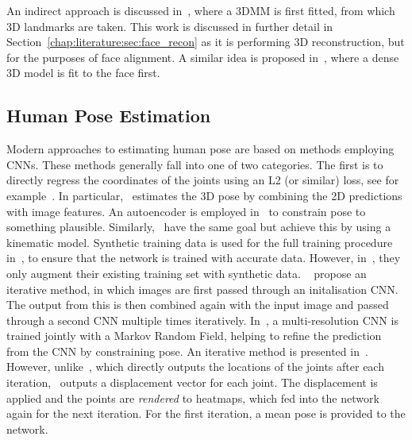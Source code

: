 An indirect approach is discussed in~\cite{zhu2016face}, where a 3DMM
is first fitted, from which 3D landmarks are taken. This work is
discussed in further detail in
Section~\ref{chap:literature:sec:face_recon} as it is performing 3D
reconstruction, but for the purposes of face alignment. A similar idea
is proposed in~\cite{jourabloo2016large}, where a dense 3D model is
fit to the face first.

\subsection{Human Pose Estimation}


Modern approaches to estimating human pose are based on methods
employing CNNs. These methods generally fall into one of two
categories. The first is to directly regress the coordinates of the
joints using an L2 (or similar) loss, see for
example~\cite{li20143d,park20163d,tekin2016structured,tekin2016direct,zhou2016deep,chen2016synthesizing,ghezelghieh2016learning,toshev2014deeppose,tompson2014joint}. In
particular,~\cite{park20163d} estimates the 3D pose by combining the
2D predictions with image features. An autoencoder is employed
in~\cite{tekin2016structured} to constrain pose to something
plausible. Similarly,~\cite{zhou2016deep} have the same goal but
achieve this by using a kinematic model. Synthetic training data is
used for the full training procedure in~\cite{chen2016synthesizing},
to ensure that the network is trained with accurate data. However,
in~\cite{ghezelghieh2016learning}, they only augment their existing
training set with synthetic data. ~\cite{toshev2014deeppose} propose
an iterative method, in which images are first passed through an
initalisation CNN. The output from this is then combined again with
the input image and passed through a second CNN multiple times
iteratively.  In~\cite{tompson2014joint}, a multi-resolution CNN is
trained jointly with a Markov Random Field, helping to refine the
prediction from the CNN by constraining pose. An iterative method is
presented in~\cite{carreira2016human}. However,
unlike~\cite{toshev2014deeppose}, which directly outputs the locations
of the joints after each iteration,~\cite{carreira2016human} outputs a
displacement vector for each joint. The displacement is applied and
the points are \textit{rendered} to heatmaps, which fed into the
network again for the next iteration. For the first iteration, a mean
pose is provided to the network.


